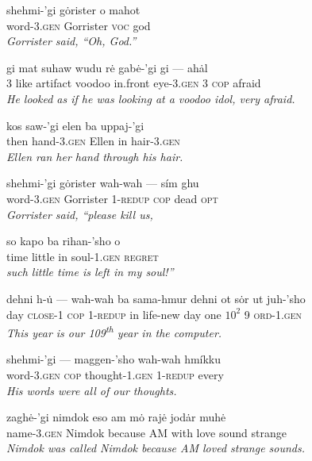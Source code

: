 \documentclass{article}[10pt]
\begin{document}
\begin{exe}
\ex
\gll shehmi-'gi g\.{o}rister o mahot\\
word-3.\textsc{gen} Gorrister \textsc{voc} god\\
\trans \emph{Gorrister said, ``Oh, God.''}

\ex
\gll gi mat suhaw wudu r\.{e} gab\.{e}-'gi gi --- ah\.{a}l\\
3 like artifact voodoo in.front eye-3.\textsc{gen} 3 \textsc{cop} afraid\\
\trans \emph{He looked as if he was looking at a voodoo idol, very afraid.}

\ex
\gll kos saw-'gi elen ba uppaj-'gi\\
then hand-3.\textsc{gen} Ellen in hair-3.\textsc{gen}\\
\trans \emph{Ellen ran her hand through his hair.}

\ex
\gll shehmi-'gi g\.{o}rister wah-wah --- s\'{i}m ghu\\
word-3.\textsc{gen} Gorrister 1-\textsc{redup} \textsc{cop} dead \textsc{opt}\\
\trans \emph{Gorrister said, ``please kill us,}

\ex
\gll so kapo ba rihan-'sho o\\
time little in soul-1.\textsc{gen} \textsc{regret}\\
\trans \emph{such little time is left in my soul!''}


\ex
\gll dehni h-\.{u} --- wah-wah ba sama-hmur dehni ot s\.{o}r ut juh-'sho\\
day \textsc{close}-1 \textsc{cop} 1-\textsc{redup} in life-new day one $10^2$ 9 \textsc{ord}-1.\textsc{gen}\\
\trans \emph{This year is our 109\textsuperscript{th} year in the computer.}


\ex
\gll shehmi-'gi --- maggen-'sho wah-wah hm\'{i}kku\\
word-3.\textsc{gen} \textsc{cop} thought-1.\textsc{gen} 1-\textsc{redup} every\\
\trans \emph{His words were all of our thoughts.}


\ex 
\gll zagh\.{e}-'gi nimdok eso am m\.{o} raj\.{e} jod\.{a}r muh\.{e}\\
name-3.\textsc{gen} Nimdok because AM with love sound strange\\
\trans \emph{Nimdok was called Nimdok because AM loved strange sounds.}


\end{exe}
\end{document}
